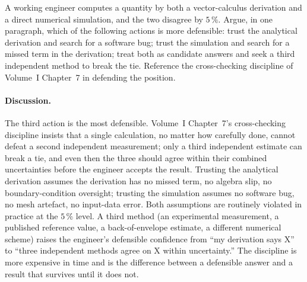 \begin{exercise}
A working engineer computes a quantity by both a vector-calculus
derivation and a direct numerical simulation, and the two disagree
by $5\,\%$. Argue, in one paragraph, which of the following actions
is more defensible: trust the analytical derivation and search for
a software bug; trust the simulation and search for a missed term in
the derivation; treat both as candidate answers and seek a third
independent method to break the tie. Reference the cross-checking
discipline of Volume~I Chapter~7 in defending the position.

\paragraph{Discussion.} The third action is the most defensible.
Volume~I Chapter~7's cross-checking discipline insists that a
single calculation, no matter how carefully done, cannot defeat a
second independent measurement; only a third independent estimate
can break a tie, and even then the three should agree within their
combined uncertainties before the engineer accepts the result.
Trusting the analytical derivation assumes the derivation has no
missed term, no algebra slip, no boundary-condition oversight;
trusting the simulation assumes no software bug, no mesh artefact,
no input-data error. Both assumptions are routinely violated in
practice at the $5\,\%$ level. A third method (an experimental
measurement, a published reference value, a back-of-envelope
estimate, a different numerical scheme) raises the engineer's
defensible confidence from ``my derivation says X'' to ``three
independent methods agree on X within uncertainty.'' The discipline
is more expensive in time and is the difference between a
defensible answer and a result that survives until it does not.
\end{exercise}
